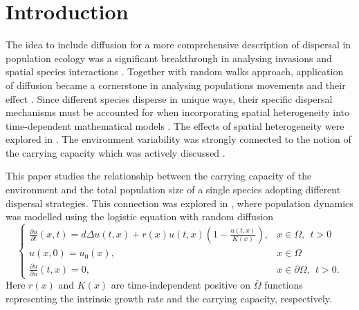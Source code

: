 \documentclass[11pt]{article}
\newcommand{\parentheses}[1]{\left(#1\right)}
\renewcommand{\date}[1]{\setcounter{equation}{0} \vspace{1cm}\begin{center} {\Large\bf #1} \end{center}}
\theoremstyle{definition}
\theoremstyle{remark}
\begin{document}








%  


% 



\section{Introduction}

The idea to include diffusion for a more comprehensive description of dispersal in population ecology was a significant breakthrough in analysing invasions and spatial species interactions \cite{Skellam}. 
Together with random walks approach, application of diffusion became a cornerstone in analysing populations movements and their effect \cite{Ang2016,Ang2016_a,Hastings,Levin}.
Since different species disperse in unique ways, their specific dispersal mechanisms must be accounted for when incorporating spatial heterogeneity into time-dependent mathematical models \cite{CCBook}.
The effects of spatial heterogeneity were explored in \cite{He1,He2,He3}. The environment variability was strongly connected to the notion of the carrying capacity which was actively discussed \cite{Mallet,Zhang}.

This paper studies the relationship between the carrying capacity of the environment and the total population size of a single species adopting different dispersal strategies. This connection was explored in  \cite{Ang2016,Ang2016_a,Guo_2020,Lou}, where population dynamics was modelled using the logistic equation with random diffusion 
\begin{equation}\label{intro1}
    \begin{cases}
        \frac{\partial u}{\partial t}(x,t)=d\Delta u(t,x) +r(x)u (t,x) \parentheses{1-\frac{u(t,x)}{K(x)}}, &  x \in \Omega, ~~ t>0 \\
        u(x,0)=u_0(x),& x\in\Omega \\
        \frac{\partial u}{\partial n}(t,x)=0 , &  x \in \partial\Omega,~~ t>0.
    \end{cases} 
\end{equation}
Here $r(x)$ and $K(x)$ are time-independent positive on $\bar\Omega$ functions representing the intrinsic growth rate and the carrying capacity, respectively. 
\end{document}
